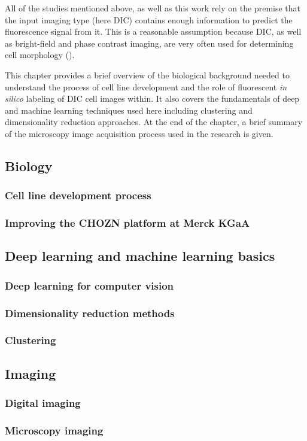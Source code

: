 All of the studies mentioned above, as well as this work rely on the premise that the input imaging type (here DIC) contains enough information to predict the fluorescence signal from it. This is a reasonable assumption because DIC, as well as bright-field and phase contrast imaging, are very often used for determining cell morphology (\cite{Kasprowicz_2017}).

This chapter provides a brief overview of the biological background needed to understand the process of cell line development and the role of fluorescent \textit{in silico} labeling of DIC cell images within. It also covers the fundamentals of deep and machine learning techniques used here including clustering and dimensionality reduction approaches. At the end of the chapter, a brief summary of the microscopy image acquisition process used in the research is given.

    \subsection{Biology}
        \subsubsection{Cell line development process}
        
        \subsubsection{Improving the CHOZN\raisebox{1ex}{\small{\textregistered}} platform at Merck KGaA}
        
    \subsection{Deep learning and machine learning basics}\label{subsection:dl}
        \subsubsection{Deep learning for computer vision}
            
        \subsubsection{Dimensionality reduction methods}
            
        \subsubsection{Clustering}
            
    \subsection{Imaging}
        \subsubsection{Digital imaging}
            
        \subsubsection{Microscopy imaging}
            